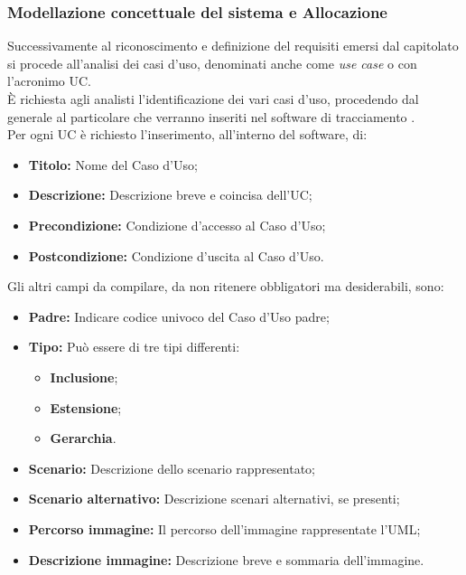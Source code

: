     \subsubsection{Modellazione concettuale del sistema e Allocazione}
      Successivamente al riconoscimento e definizione del requisiti emersi dal capitolato si procede all'analisi dei casi d'uso, denominati anche come
      \emph{use case} o con l'acronimo UC.\\
      È richiesta agli analisti l'identificazione dei vari casi d'uso, procedendo dal generale al particolare che verranno inseriti nel software di tracciamento
      .\\
      Per ogni UC è richiesto l'inserimento, all'interno del software, di:
      \begin{itemize}
        \item \textbf{Titolo: }Nome del Caso d'Uso;
        \item \textbf{Descrizione: }Descrizione breve e coincisa dell'UC;
        \item \textbf{Precondizione: }Condizione d'accesso al Caso d'Uso;
        \item \textbf{Postcondizione: }Condizione d'uscita al Caso d'Uso.
      \end{itemize}
      Gli altri campi da compilare, da non ritenere obbligatori ma desiderabili, sono:
      \begin{itemize}
        \item \textbf{Padre: }Indicare codice univoco del Caso d'Uso padre;
        \item \textbf{Tipo: }Può essere di tre tipi differenti:
        \bgroup
          \begin{itemize}
            \item \textbf{Inclusione};
            \item \textbf{Estensione};
            \item \textbf{Gerarchia}.
          \end{itemize}
        \egroup
        \item \textbf{Scenario: }Descrizione dello scenario rappresentato;
        \item \textbf{Scenario alternativo: }Descrizione scenari alternativi, se presenti;
        \item \textbf{Percorso immagine: }Il percorso dell'immagine rappresentate l'UML;
        \item \textbf{Descrizione immagine: }Descrizione breve e sommaria dell'immagine.
      \end{itemize}
